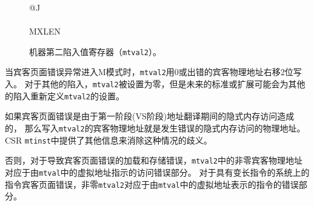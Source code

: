 \begin{figure*}[h!]
{\footnotesize
\begin{center}
\begin{tabular}{@{}J}
 \\
\hline
{} \\
\hline
MXLEN \\
\end{tabular}
\end{center}
}
\vspace{-0.1in}
\caption{机器第二陷入值寄存器（{\tt mtval2}）。
  }
\label{mtval2reg}
\end{figure*}

当宾客页面错误异常进入M模式时，{\tt mtval2}用0或出错的宾客物理地址右移2位写入。
对于其他的陷入，{\tt mtval2}被设置为零，但是未来的标准或扩展可能会为其他的陷入重新定义{\tt mtval2}的设置。

如果宾客页面错误是由于第一阶段(VS阶段)地址翻译期间的隐式内存访问造成的，
那么写入{\tt mtval2}的宾客物理地址就是发生错误的隐式内存访问的物理地址。
CSR {\tt mtinst}中提供了其他信息来消除这种情况的歧义。

否则，对于导致宾客页面错误的加载和存储错误，{\tt mtval2}中的非零宾客物理地址对应于由{\tt mtval}中的虚拟地址指示的访问错误部分。
对于具有变长指令的系统上的指令宾客页面错误，非零{\tt mtval2}对应于由{\tt mtval}中的虚拟地址表示的指令的错误部分。

